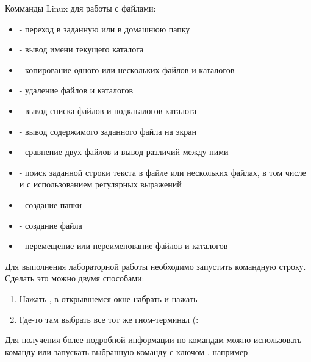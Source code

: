 \documentclass[a4paper,12pt]{article}
\begin{document}
  
  \begin{flushleft}
    Комманды Linux для работы с файлами:
    \begin{itemize}
      \item {} - переход в заданную или в домашнюю папку
      \item {} - вывод имени текущего каталога
      \item {} - копирование одного или нескольких файлов и каталогов
      \item {} - удаление файлов и каталогов
      \item {} - вывод списка файлов и подкаталогов каталога
      \item {} - вывод содержимого заданного файла на экран
      \item {} - сравнение двух файлов и вывод различий между ними
      \item {} - поиск заданной строки текста в файле или нескольких файлах, в том числе и с использованием регулярных выражений
      \item {} - создание папки
      \item {} - создание файла
      \item {} - перемещение или переименование файлов и каталогов
    \end{itemize}
  \end{flushleft}
  
  \begin{flushleft}
    Для выполнения лабораторной работы необходимо запустить командную строку. Сделать это можно двумя способами:
    \begin{enumerate}
      \item Нажать , в открывшемся окне набрать  и нажать 
      \item Где-то там выбрать все тот же гном-терминал (:
    \end{enumerate}
  \end{flushleft}
  
  \begin{flushleft}
    Для получения более подробной информации по командам можно использовать команду  или запускать выбранную команду с ключом , например 
  \end{flushleft}
  
\end{document}
